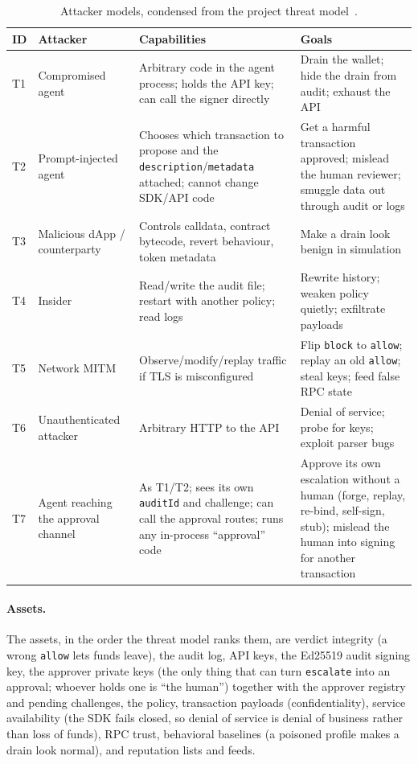\documentclass[10pt]{article}
\newcommand{\code}[1]{{\def\_{\char`\_\allowbreak}\texttt{#1}}}
\begin{document}
\begin{table}[!htbp]
\centering\small
\begin{tabularx}{\textwidth}{l L{3.2cm} Y Y}
\toprule
ID & Attacker & Capabilities & Goals \\
\midrule
T1 & Compromised agent & Arbitrary code in the agent process; holds the API key; can call the signer directly & Drain the wallet; hide the drain from audit; exhaust the API \\
T2 & Prompt-injected agent & Chooses which transaction to propose and the \code{description}/\code{metadata} attached; cannot change SDK/API code & Get a harmful transaction approved; mislead the human reviewer; smuggle data out through audit or logs \\
T3 & Malicious dApp / counterparty & Controls calldata, contract bytecode, revert behaviour, token metadata & Make a drain look benign in simulation \\
T4 & Insider & Read/write the audit file; restart with another policy; read logs & Rewrite history; weaken policy quietly; exfiltrate payloads \\
T5 & Network MITM & Observe/modify/replay traffic if TLS is misconfigured & Flip \code{block} to \code{allow}; replay an old \code{allow}; steal keys; feed false RPC state \\
T6 & Unauthenticated attacker & Arbitrary HTTP to the API & Denial of service; probe for keys; exploit parser bugs \\
T7 & Agent reaching the approval channel & As T1/T2; sees its own \code{auditId} and challenge; can call the approval routes; runs any in-process ``approval'' code & Approve its own escalation without a human (forge, replay, re-bind, self-sign, stub); mislead the human into signing for another transaction \\
\bottomrule
\end{tabularx}
\caption{Attacker models, condensed from the project threat model~\cite{threatmodel}.}
\label{tab:attackers}
\end{table}

\paragraph{Assets.} The assets, in the order the threat model ranks them, are verdict integrity (a wrong \code{allow} lets funds leave), the audit log, API keys, the Ed25519 audit signing key, the approver private keys (the only thing that can turn \code{escalate} into an approval; whoever holds one is ``the human'') together with the approver registry and pending challenges, the policy, transaction payloads (confidentiality), service availability (the SDK fails closed, so denial of service is denial of business rather than loss of funds), RPC trust, behavioral baselines (a poisoned profile makes a drain look normal), and reputation lists and feeds.
\end{document}

